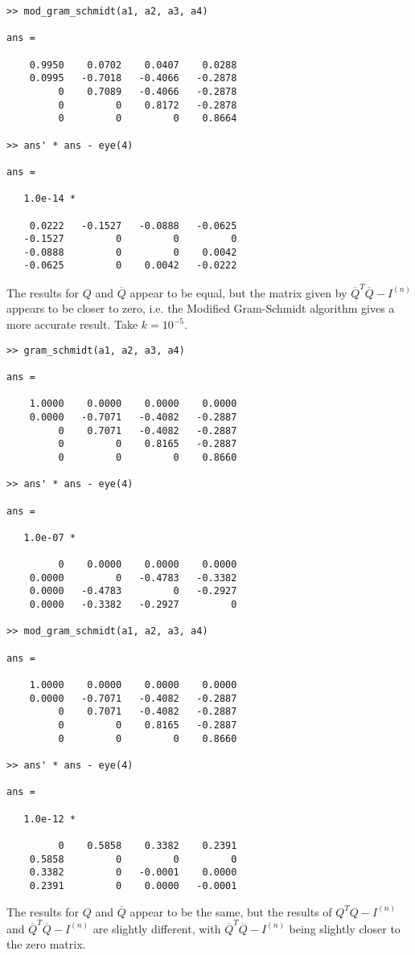 \documentclass{article}
\begin{document}
\begin{enumerate}
\begin{enumerate}
\begin{verbatim}
>> mod_gram_schmidt(a1, a2, a3, a4)

ans =

    0.9950    0.0702    0.0407    0.0288
    0.0995   -0.7018   -0.4066   -0.2878
         0    0.7089   -0.4066   -0.2878
         0         0    0.8172   -0.2878
         0         0         0    0.8664
         
>> ans' * ans - eye(4)

ans =

   1.0e-14 *

    0.0222   -0.1527   -0.0888   -0.0625
   -0.1527         0         0         0
   -0.0888         0         0    0.0042
   -0.0625         0    0.0042   -0.0222
    \end{verbatim}
    The results for $Q$ and $\overline{Q}$ appear to be equal, but the matrix given by $\overline{Q}^T\overline{Q} - I^{(n)}$ appears to be closer to zero, i.e. the Modified Gram-Schmidt algorithm gives a more accurate result.
    \newpage
    Take $k = 10^{-5}$.
    \begin{verbatim}
>> gram_schmidt(a1, a2, a3, a4)

ans =

    1.0000    0.0000    0.0000    0.0000
    0.0000   -0.7071   -0.4082   -0.2887
         0    0.7071   -0.4082   -0.2887
         0         0    0.8165   -0.2887
         0         0         0    0.8660      

>> ans' * ans - eye(4)

ans =

   1.0e-07 *

         0    0.0000    0.0000    0.0000
    0.0000         0   -0.4783   -0.3382
    0.0000   -0.4783         0   -0.2927
    0.0000   -0.3382   -0.2927         0

>> mod_gram_schmidt(a1, a2, a3, a4)

ans =

    1.0000    0.0000    0.0000    0.0000
    0.0000   -0.7071   -0.4082   -0.2887
         0    0.7071   -0.4082   -0.2887
         0         0    0.8165   -0.2887
         0         0         0    0.8660
         
>> ans' * ans - eye(4)

ans =

   1.0e-12 *

         0    0.5858    0.3382    0.2391
    0.5858         0         0         0
    0.3382         0   -0.0001    0.0000
    0.2391         0    0.0000   -0.0001  
    \end{verbatim}
    The results for $Q$ and $\overline{Q}$ appear to be the same, but the results of $Q^TQ - I^{(n)}$ and $\overline{Q}^T\overline{Q} - I^{(n)}$ are slightly different, with $\overline{Q}^T\overline{Q} - I^{(n)}$ being slightly closer to the zero matrix.
    

\end{enumerate}
\end{enumerate}
\end{document}
